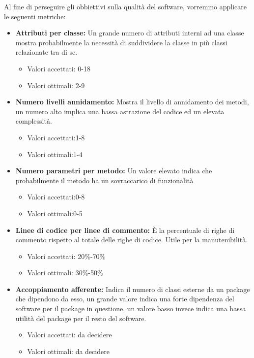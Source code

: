 \documentclass[a4paper]{report}
\begin{document}
				Al fine di perseguire gli obbiettivi sulla qualità del software, vorremmo applicare le seguenti metriche:
				\begin{itemize}
					\item \textbf{Attributi per classe:}
						Un grande numero di attributi interni ad una classe mostra probabilmente la necessità di suddividere la classe 
						in più classi relazionate tra di se.
						\begin{itemize}
							\item Valori accettati: 0-18
							\item Valori ottimali: 2-9
						\end{itemize}

					\item \textbf{Numero livelli annidamento:}
						Mostra il livello di annidamento dei metodi, un numero alto implica una bassa astrazione del codice ed 
						un elevata complessità.
						\begin{itemize}
							\item Valori accettati:1-8
							\item Valori ottimali:1-4
						\end{itemize}

					\item \textbf{Numero parametri per metodo:}
						Un valore elevato indica che probabilmente il metodo ha un sovraccarico di funzionalità
						\begin{itemize}
							\item Valori accettati:0-8
							\item Valori ottimali:0-5
						\end{itemize}

					\item \textbf{Linee di codice per linee di commento:}
						È la percentuale di righe di commento rispetto al totale delle righe di codice. Utile per la manutenibilità.
						\begin{itemize}
							\item Valori accettati: 20\%-70\%
							\item Valori ottimali: 30\%-50\%
						\end{itemize}

					\item \textbf{Accoppiamento afferente:}
						Indica il numero di classi esterne da un package che dipendono da esso, un grande valore indica una forte 
						dipendenza del software per il package in questione, un valore basso invece indica una bassa utilità del 
						package per il resto del software.
						\begin{itemize}
							\item Valori accettati: da decidere
							\item Valori ottimali: da decidere
						\end{itemize}


\end{itemize}
\end{document}
